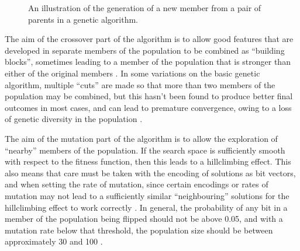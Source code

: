 \documentclass[proof,pdftex,11pt,a4,titlepage]{article}
\begin{document}
\begin{figure}[h]
  
  \caption{An illustration of the generation of a new member from a pair of parents in a genetic algorithm.}
  \label{fig:genetic-algo}
\end{figure}

The aim of the crossover part of the algorithm is to allow good features that are developed in separate members of the population to be combined as ``building blocks'', sometimes leading to a member of the population that is stronger than either of the original members \cite{Goldberg:1989}. In some variations on the basic genetic algorithm, multiple ``cuts'' are made so that more than two members of the population may be combined, but this hasn't been found to produce better final outcomes in most cases, and can lead to premature convergence, owing to a loss of genetic diversity in the population \cite{Esquivel:1997}.

The aim of the mutation part of the algorithm is to allow the exploration of ``nearby'' members of the population. If the search space is sufficiently smooth with respect to the fitness function, then this leads to a hillclimbing effect. This also means that care must be taken with the encoding of solutions as bit vectors, and when setting the rate of mutation, since certain encodings or rates of mutation may not lead to a sufficiently similar ``neighbouring'' solutions for the hillclimbing effect to work correctly \cite{Taher:2013}. In general, the probability of any bit in a member of the population being flipped should not be above 0.05, and with a mutation rate below that threshold, the population size should be between approximately 30 and 100 \cite{Grefenstette:1986}.
\end{document}
